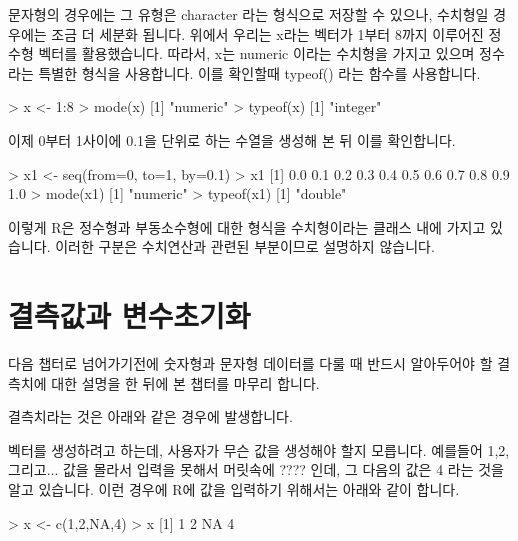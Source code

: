 문자형의 경우에는 그 유형은 character 라는 형식으로 저장할 수 있으나, 수치형일 경우에는 조금 더 세분화 됩니다. 
위에서 우리는 x라는 벡터가 1부터 8까지 이루어진 정수형 벡터를 활용했습니다.
따라서, x는 numeric 이라는 수치형을 가지고 있으며 정수라는 특별한 형식을 사용합니다. 
이를 확인할때 typeof() 라는 함수를 사용합니다. 

\begin{Schunk}
\begin{Soutput}
> x <- 1:8
> mode(x)
[1] "numeric"
> typeof(x)
[1] "integer"
\end{Soutput}
\end{Schunk}

이제 0부터 1사이에 0.1을 단위로 하는 수열을 생성해 본 뒤 이를 확인합니다. 

\begin{Schunk}
\begin{Soutput}
> x1 <- seq(from=0, to=1, by=0.1)
> x1
 [1] 0.0 0.1 0.2 0.3 0.4 0.5 0.6 0.7 0.8 0.9 1.0
> mode(x1)
[1] "numeric"
> typeof(x1)
[1] "double"
 
\end{Soutput}
\end{Schunk}

이렇게 R은 정수형과 부동소수형에 대한 형식을 수치형이라는 클래스 내에 가지고 있습니다. 
이러한 구분은 수치연산과 관련된 부분이므로 설명하지 않습니다. 



\section{결측값과 변수초기화} 

다음 챕터로 넘어가기전에 숫자형과 문자형 데이터를 다룰 때 반드시 알아두어야 할 결측치에 대한 설명을 한 뒤에 본 챕터를 마무리 합니다.

결측치라는 것은 아래와 같은 경우에 발생합니다. 

벡터를 생성하려고 하는데, 사용자가 무슨 값을 생성해야 할지 모릅니다. 
예를들어 1,2, 그리고... 값을 몰라서 입력을 못해서 머릿속에 ???? 인데, 그 다음의 값은 4 라는 것을 알고 있습니다. 
이런 경우에 R에 값을 입력하기 위해서는 아래와 같이 합니다. 

\begin{Schunk}
\begin{Soutput}
> x <- c(1,2,NA,4)
> x
[1]  1  2 NA  4
\end{Soutput}
\end{Schunk}

